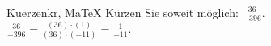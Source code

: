 \begin{MAufgabe}{Kuerzen}{kr, MaTeX}
K\"urzen Sie soweit m\"oglich: $\frac{36}{-396}$.\\ 
\ifLsg\MLoesung
\quad $\frac{36}{-396}=\frac{(36)\cdot(1)}{(36)\cdot(-11)}=\frac{1}{-11}$.\else\relax\fi
 \end{MAufgabe}